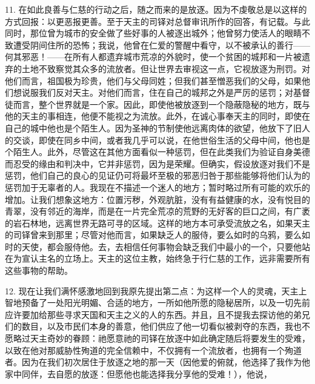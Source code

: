 11. 在如此良善与仁慈的行动之后，随之而来的是放逐。因为不虔敬总是以这样的方式回报：以更恶报更善。至于天主的司铎对总督审讯所作的回答，有记载。与此同时，那位曾为城市的安全做了些好事的人被逐出城外；他曾努力使活人的眼睛不致遭受阴间住所的恐怖；我说，他曾在仁爱的警醒中看守，以不被承认的善行——何其邪恶！——在所有人都遗弃城市荒凉的外貌时，使一个贫困的城邦和一片被遗弃的土地不致察觉其众多的流放者。但让世界去审视这一点，它视放逐为刑罚。对他们而言，祖国极为珍贵，他们与父母同姓；但我们甚至憎恶我们的父母，如果他们想说服我们反对天主。对他们而言，住在自己的城邦之外是严厉的惩罚；对基督徒而言，整个世界就是一个家。因此，即使他被放逐到一个隐蔽隐秘的地方，既与他的天主的事相连，他便不能视之为流放。此外，在诚心事奉天主的同时，即使在自己的城中他也是个陌生人。因为圣神的节制使他远离肉体的欲望，他放下了旧人的交谈，即使在同乡中间，或者我几乎可以说，在他世俗生活的父母中间，他也是个陌生人。此外，尽管这在其他方面看似一种惩罚，但在此类我们为验证自身美德而忍受的缘由和判决中，它并非惩罚，因为是荣耀。但确实，假设放逐对我们不是惩罚，他们自己的良心的见证仍可将最坏至极的邪恶归咎于那些能够将他们认为的惩罚加于无辜者的人。我现在不描述一个迷人的地方；暂时略过所有可能的欢乐的增加。让我们想象这地方：位置污秽，外观肮脏，没有有益健康的水，没有悦目的青翠，没有邻近的海岸，而是在一片完全荒凉的荒野的无好客的巨口之间，有广袤的岩石林地，远离世界无路可寻的区域。这样的地方本可承受流放之名，如果天主的司铎曾来到那里；尽管对他而言，如果缺乏人的服侍，要么如时的乌鸦，要么如时的天使，都会服侍他。去，去相信任何事物会缺乏我们中最小的一个，只要他站在为宣认主名的立场上。天主的这位主教，始终急于行仁慈的工作，远非需要所有这些事物的帮助。\par

12. 现在让我们满怀感激地回到我原先提出第二点：为这样一个人的灵魂，天主上智地预备了一处阳光明媚、合适的地方，一所如他所愿的隐秘居所，以及一切先前应许要加给那些寻求天国和天主之义的人的东西。并且，且不提我去探访他的弟兄们的数目，以及市民们本身的善意，他们供应了他一切看似被剥夺的东西，我也不愿略过天主奇妙的眷顾：祂愿意祂的司铎在放逐中如此确定随后将要发生的受难，以致在他对那威胁性殉道的完全信赖中，不仅拥有一个流放者，也拥有一个殉道者。因为在我们初次居住于放逐之地的那一天（因他爱的俯就，他选择了我作为他家中同伴，去自愿的放逐：但愿他也能选择我分享他的受难！），他说，\par

